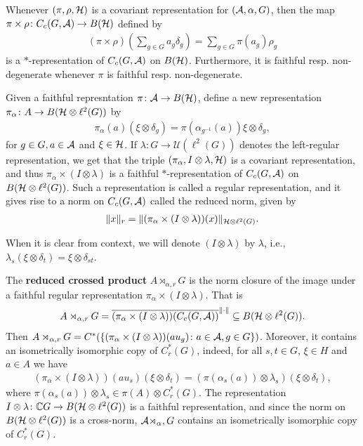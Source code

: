 \begin{remark}
Whenever $(\pi,\rho,\mathcal{H})$ is a covariant representation for $(\mathcal{A},\alpha,G)$, then the map $\pi \times \rho \colon C_c(G,\mathcal{A}) \to B(\mathcal{H})$ defined by
\begin{align*}
(\pi \times \rho) \left(\sum_{g \in G}a_{g}\delta_{g} \right)= \sum_{g \in G} \pi(a_{g}) \rho_{g}
\end{align*}
is a $*$-representation of $C_c(G,\mathcal{A})$ on $B(\mathcal{H})$. Furthermore, it is faithful resp. non-degenerate whenever $\pi$ is faithful resp. non-degenerate.

\noindent Given a faithful represntation $\pi \colon \mathcal{A} \to B(\mathcal{H})$, define a new representation $\pi_{\alpha} \colon A \to B(\mathcal{H} \otimes \ell^2(G))$ by
\begin{align*}
\pi_{\alpha}(a)(\xi \otimes \delta_{g})=\pi(\alpha_{g^{-1}}(a))\xi \otimes \delta_{g},
\end{align*} for $g \in G, a \in \mathcal{A}$ and $\xi \in \mathcal{H} $. If $\lambda \colon G \to \mathcal{U}(\ell^2(G))$ denotes the left-regular representation, we get that the triple $(\pi_{\alpha}, I \otimes \lambda,\mathcal{H})$ is a covariant representation, and thus $\pi_{\alpha} \times (I \otimes \lambda)$ is a faithful $*$-representation of $C_c(G,\mathcal{A})$ on $B(\mathcal{H} \otimes \ell^2(G))$. Such a representation is called a regular representation, and it gives rise to a norm on $C_c(G,\mathcal{A})$ called the reduced norm, given by 
\begin{align*}
\lVert x \rVert_{r}=\lVert (\pi_{\alpha} \times (I \otimes \lambda))(x)\rVert_{\mathcal{H} \otimes \ell^2(G)}.
\end{align*}
\end{remark}
\noindent When it is clear from context, we will denote $(I \otimes \lambda)$ by $\lambda$, i.e., $\lambda_s(\xi \otimes \delta_t)=\xi \otimes \delta_{st}$.	

\begin{definition}
The \textbf{reduced crossed product} $A \rtimes_{\alpha,r}G$ is the norm closure of the image under a faithful regular representation $\pi_{\alpha} \times(I\otimes \lambda)$. That is
\begin{align*}
A \rtimes_{\alpha,r}G= \overline{(\pi_{\alpha}\times(I \otimes \lambda))(C_c(G,\mathcal{A}))}^{\lVert \cdot \rVert} \subseteq B(\mathcal{H} \otimes \ell^2(G)).
\end{align*}
Then $A \rtimes_{\alpha,r} G=C^*(\{(\pi_{\alpha} \times (I \otimes \lambda))(a u_{g}) \colon a \in \mathcal{A}, g \in G\})$. Moreover, it contains an isometrically isomorphic copy of $C_r^*(G)$, indeed, for all $s,t \in G$, $\xi \in H$ and $a \in A$ we have 
\begin{align*}
(\pi_\alpha \times (I \otimes \lambda))(a u_s) (\xi \otimes \delta_t)=(\pi({\alpha_s}(a))\otimes \lambda_s)(\xi \otimes \delta_t),
\end{align*}
where $ \pi(\alpha_s(a)) \otimes \lambda_s \in \pi(A) \otimes C_r^*(G)$. The representation $I \otimes \lambda \colon \mathbb{C} G \to B(\mathcal{H} \otimes \ell^2(G))$ is a faithful representation, and since the norm on $B(\mathcal{H} \otimes \ell^2(G))$ is a cross-norm, $\mathcal{A} \rtimes_{\alpha},G$ contains an isometrically isomorphic copy of $C_r^*(G)$.
\end{definition}

